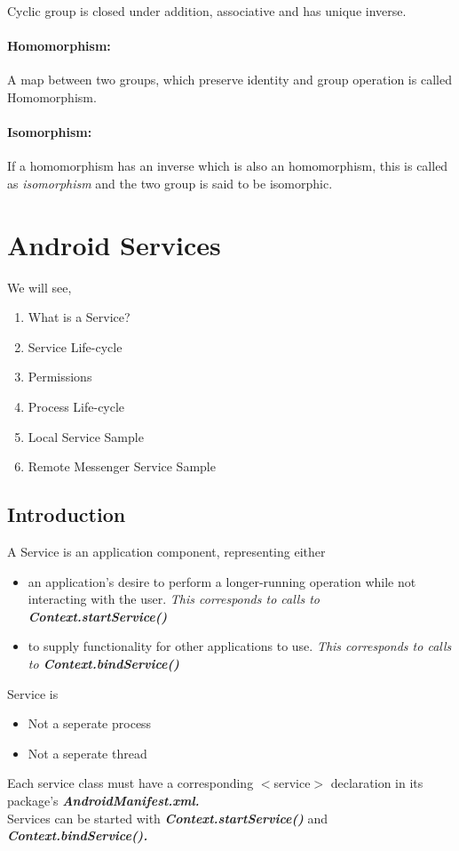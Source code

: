 \documentclass[12pt]{article}
\begin{document}
Cyclic group is closed under addition, associative and has unique inverse.

\paragraph{Homomorphism:} A map between two groups, which preserve identity and group operation is called Homomorphism.

\paragraph{Isomorphism:} If a homomorphism has an inverse which is also an homomorphism, this is called as \textit{isomorphism} and the two group is said to be isomorphic.

%
%


\pagebreak
\section{Android Services}
\label{Android Services}

We will see, 
\begin{enumerate}
\item What is a Service?
\item Service Life-cycle
\item Permissions
\item Process Life-cycle
\item Local Service Sample
\item Remote Messenger Service Sample
\end{enumerate}

\subsection{Introduction}
A Service is an application component, representing either 
\begin{itemize}
\item{an application's desire to perform a longer-running operation while not interacting with the user. \textit{This corresponds to calls to \textbf{Context.startService()}}}
\item{to supply functionality for other applications to use. \textit{This corresponds to calls to \textbf{Context.bindService()}}}
\end{itemize} 
Service is 
\begin{itemize}
\item Not a seperate process
\item Not a seperate thread
\end{itemize}
Each service class must have a corresponding $<$service$>$ declaration in its package's \textit{\textbf{AndroidManifest.xml.}} \\
Services can be started with \textbf{\textit{Context.startService()}} and \textbf{\textit{Context.bindService().}}\\
\end{document}
